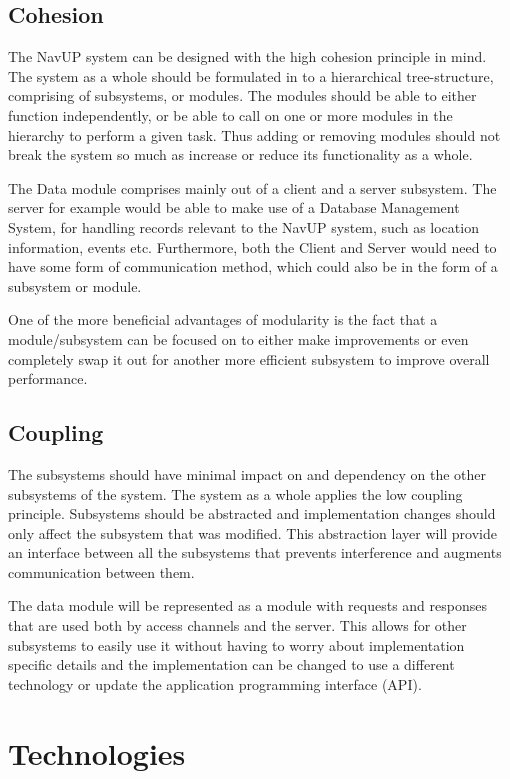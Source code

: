 \documentclass[11pt]{article}
\begin{document}
	\subsection{Cohesion}
	The NavUP system can be designed with the high cohesion principle in mind.  The system as a whole should be formulated in to a hierarchical tree-structure, comprising of subsystems, or modules.  The modules should be able to either function independently, or be able to call on one or more modules in the hierarchy to perform a given task.  Thus adding or removing modules should not break the system so much as increase or reduce  its functionality as a whole.
	
	The Data module comprises mainly out of a client and a server subsystem.  The server for example would be able to make use of a Database Management System, for handling records relevant to the NavUP system, such as location information, events etc.  Furthermore, both the Client and Server would need to have some form of communication method, which could also be in the form of a subsystem or module.
	
	One of the more beneficial advantages of modularity is the fact that a module/subsystem can be focused on to either make improvements or even completely swap it out for another more efficient subsystem to improve overall performance.
	\subsection{Coupling}
	The subsystems should have minimal impact on and dependency on the other subsystems of the system. The system as a whole applies the low coupling principle. Subsystems should be abstracted and implementation changes should only affect the subsystem that was modified. This abstraction layer will provide an interface between all the subsystems that prevents interference and augments communication between them.
	
	The data module will be represented as a module with requests and responses that are used both by access channels and the server. This allows for other subsystems to easily use it without having to worry about implementation specific details and the implementation can be changed to use a different technology or update the application programming interface (API).
	
	\section{Technologies}
\end{document}
